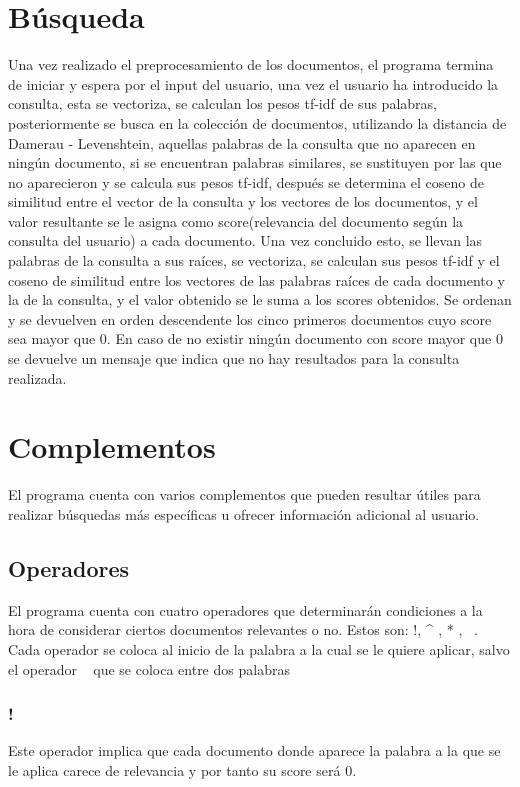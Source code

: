 \documentclass{report}
\begin{document}
  \chapter{Búsqueda}
 Una vez realizado el preprocesamiento de los documentos, el programa termina de iniciar y espera por el input del usuario,
 una vez el usuario ha introducido la consulta, esta se vectoriza, se calculan los pesos tf-idf de sus palabras, posteriormente se busca en la colección de documentos, utilizando la distancia
 de Damerau - Levenshtein,  aquellas palabras de la consulta que no aparecen en ningún documento, si se encuentran palabras similares, se sustituyen
 por las que no aparecieron y se calcula sus pesos tf-idf, después se determina el coseno de similitud entre el vector de la consulta y los vectores de los documentos, y el valor resultante se le asigna como
 score(relevancia del documento según la consulta del usuario) a cada documento. Una vez concluido esto, se llevan las palabras
 de la consulta a sus raíces, se vectoriza, se calculan sus pesos tf-idf y el coseno de similitud entre los vectores de las palabras
 raíces de cada documento y la de la consulta, y el valor obtenido se le suma a los scores obtenidos. Se ordenan y se devuelven 
 en orden descendente los cinco primeros documentos cuyo score sea mayor que 0. En caso de no existir ningún documento con score mayor que 0 
 se devuelve un mensaje que indica que no hay resultados para la consulta realizada.

 \chapter{Complementos}
 
 El programa cuenta con varios complementos que pueden resultar útiles para realizar búsquedas más específicas u ofrecer
 información adicional al usuario.

 \section{Operadores}

 El programa cuenta con cuatro operadores que determinarán condiciones a la hora de considerar ciertos documentos relevantes o no.
 Estos son:  !, \^{} , * , ~. Cada operador se coloca al inicio de la palabra a la cual se le quiere aplicar, salvo el operador ~
 que se coloca entre dos palabras

 \subsection{!}
 Este operador implica que cada documento donde aparece la palabra a la que se le aplica carece de relevancia y por tanto su score será 0.
\end{document}
